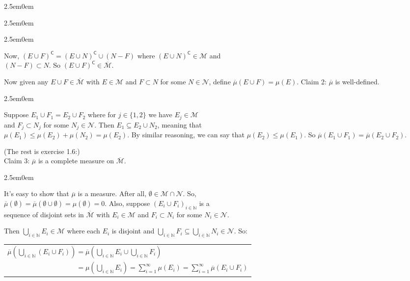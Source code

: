\documentclass{book}
\newcommand{\hFour}{%
   \color{Cyan!80!black}
   \fontsize{12}{14}\selectfont%
}
\newcommand{\exP}{%
   \color{Purple}%
   \fontsize{12}{14}\selectfont%
}
\newcommand{\exPP}{%
   \color{RedViolet}%
   \fontsize{12}{14}\selectfont%
}
\newenvironment{myIndent}{%
   \begin{adjustwidth}{2.5em}{0em}%
}{%
   \end{adjustwidth}%
}
\newcommand{\comp}{\mathsf{C}}
\newcommand{\retTwo}{\hfill\bigbreak}
\begin{document}
\begin{myIndent}
\begin{myIndent}
\begin{myIndent}
         Now, $(E \cup F)^\comp = (E \cup N)^\comp \cup (N - F)$ where $(E \cup N)^\comp \in \mathcal{M}$ and\\ $(N - F) \subset N$. So $(E \cup F)^\comp \in \overline{\mathcal{M}}$.\retTwo
      \end{myIndent}

      Now given any $E \cup F \in \overline{\mathcal{M}}$ with $E \in \mathcal{M}$ and $F \subset N$ for some $N \in \mathcal{N}$, define $\overline{\mu}(E \cup F) = \mu(E)$.\retTwo
      Claim 2: $\overline{\mu}$ is well-defined.
      \begin{myIndent}\hFour
         Suppose $E_1 \cup F_1 = E_2 \cup F_2$ where for $j \in \{1, 2\}$ we have $E_j \in \mathcal{M}$\\ and $F_j \subset N_j$ for some $N_j \in \mathcal{N}$. Then $E_1 \subseteq E_2 \cup N_2$, meaning that\\ $\mu(E_1) \leq \mu(E_2) + \mu(N_2) = \mu(E_2)$. By similar reasoning, we can say that $\mu(E_2) \leq \mu(E_1)$. So $\overline{\mu}(E_1 \cup F_1) = \overline{\mu}(E_2 \cup F_2)$.
         \retTwo
      \end{myIndent}

      \exP (The rest is exercise 1.6:)\\
      Claim 3: $\overline{\mu}$ is a complete measure on $\overline{\mathcal{M}}$.
      \begin{myIndent}\exPP
         It's easy to show that $\overline{\mu}$ is a measure. After all, $\emptyset \in \mathcal{M} \cap \mathcal{N}$. So,\\ $\overline{\mu}(\emptyset) = \overline{\mu}(\emptyset \cup \emptyset) = \mu(\emptyset) = 0$. Also, suppose $(E_i \cup F_i)_{i \in \mathbb{N}}$ is a\\ sequence of disjoint sets in $\overline{\mathcal{M}}$ with $E_i \in \mathcal{M}$ and $F_i \subset N_i$ for some $N_i \in \mathcal{N}$.\newpage

         Then $\bigcup\limits_{i \in \mathbb{N}}E_i \in \mathcal{M}$ where each $E_i$ is disjoint and $\bigcup\limits_{i \in \mathbb{N}}F_i \subseteq \bigcup\limits_{i \in \mathbb{N}}N_i \in \mathcal{N}$. So:

         {\center 
         \begin{tabular}{l}
            $\overline{\mu}(\bigcup\limits_{i \in \mathbb{N}}(E_i \cup F_i)) = \overline{\mu}(\bigcup\limits_{i \in \mathbb{N}}E_i \cup \bigcup\limits_{i \in \mathbb{N}}F_i)$\\ [12pt]
             $\phantom{\overline{\mu}(\bigcup\limits_{i \in \mathbb{N}}(E_i \cup F_i))} = \mu(\bigcup\limits_{i \in \mathbb{N}}E_i) = \sum\limits_{i = 1}^\infty\mu(E_i) = \sum\limits_{i = 1}^\infty\overline{\mu}(E_i \cup F_i)$
         \end{tabular}\retTwo\par}


\end{myIndent}
\end{myIndent}
\end{myIndent}
\end{document}
